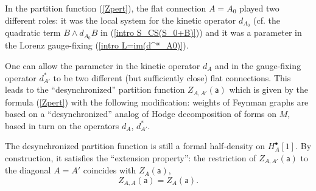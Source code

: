 \documentclass[11pt,a4paper]{amsart}
\theoremstyle{plain} %
\theoremstyle{definition}
\theoremstyle{remark}
\newcommand{\sfa}{\mathsf{a}}
\newcommand{\bt}{\bullet}
\begin{document}
In the partition function (\ref{Zpert}), the flat connection $A=A_0$ played two different roles: it was the local system for the kinetic operator $d_{A_0}$ (cf. the quadratic term $B\wedge d_{A_0} B$ in (\ref{intro S_CS(S_0+B)})) and it was a parameter in the Lorenz gauge-fixing (\ref{intro L=im(d^*_A0)}). 

One can 
allow the parameter in the kinetic operator $d_{A}$ %
and in the gauge-fixing operator $d^*_{A'}$ to be two different (but sufficiently close)
flat connections. This leads to the ``desynchronized'' partition function $Z_{A,A'}(\sfa)$ which is given by the formula (\ref{Zpert}) with the following modification:
    weights of Feynman graphs are based on a ``desynchronized'' analog of Hodge decomposition of forms on $M$, based in turn on the operators $d_{A}$, $d^*_{A'}$.

The desynchronized partition function is still a formal half-density on $H^\bt_{A}[1]$. By construction, it satisfies the ``extension property'': the restriction of $Z_{A,A'}(\sfa)$ to the diagonal $A=A'$ coincides with $Z_{A}(\sfa)$, 
    \begin{equation}
        Z_{A,A}(\sfa) = Z_{A}(\sfa).
    \end{equation}
\end{document}
